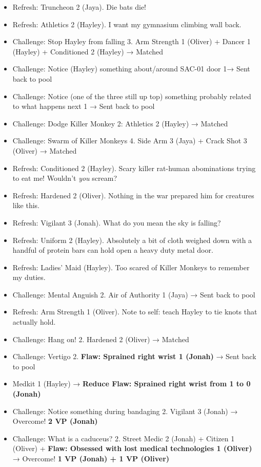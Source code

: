 {\begin{itemize}
\item Refresh: Truncheon 2 (Jaya).  Die bats die!
\item Refresh: Athletics 2 (Hayley).  I want my gymnasium climbing wall back.
\item Challenge: Stop Hayley from falling 3.  Arm Strength 1 (Oliver) + Dancer 1 (Hayley) + Conditioned 2 (Hayley) → Matched
\item Challenge: Notice (Hayley) something about/around SAC-01 door 1→ Sent back to pool
\item Challenge: Notice  (one of the three still up top) something probably related to what happens next 1 → Sent back to pool
\item Challenge: Dodge Killer Monkey 2: Athletics 2 (Hayley) → Matched
\item Challenge: Swarm of Killer Monkeys 4.  Side Arm 3 (Jaya) + Crack Shot 3 (Oliver) → Matched
\item Refresh: Conditioned 2 (Hayley).  Scary killer rat-human abominations trying to eat me!  Wouldn't \textit{you} scream?
\item Refresh: Hardened 2 (Oliver). Nothing in the war prepared him for creatures like this.
\item Refresh: Vigilant 3 (Jonah).  What do you mean the sky is falling?
\item Refresh: Uniform 2 (Hayley).  Absolutely a bit of cloth weighed down with a handful of protein bars can hold open a heavy duty metal door.
\item Refresh: Ladies' Maid (Hayley). Too scared of Killer Monkeys to remember my duties.
\item Challenge: Mental Anguish 2.  Air of Authority 1 (Jaya) → Sent back to pool
\item Refresh: Arm Strength 1 (Oliver).  Note to self: teach Hayley to tie knots that actually hold.
\item Challenge: Hang on! 2. Hardened 2 (Oliver) → Matched
\item Challenge: Vertigo 2. \textbf{ {\color[RGB]{255,0,0}Flaw: Sprained right wrist 1 (Jonah)} } {\color[RGB]{255,0,0} } → Sent back to pool
\item Medkit 1 (Hayley) → \textbf{ {\color[RGB]{255,0,0}Reduce Flaw: Sprained right wrist from 1 to 0 (Jonah)} }
\item Challenge: Notice something during bandaging 2.  Vigilant 3 (Jonah) → Overcome! \textbf{2 VP (Jonah)}
\item Challenge: What is a caduceus? 2.  Street Medic 2 (Jonah) + Citizen 1 (Oliver) + \textbf{ {\color[RGB]{255,0,0}Flaw: Obsessed with lost medical technologies 1 (Oliver)} }\textbf{ }→ Overcome! \textbf{1 VP (Jonah) + 1 VP (Oliver)}

\end{itemize}}
